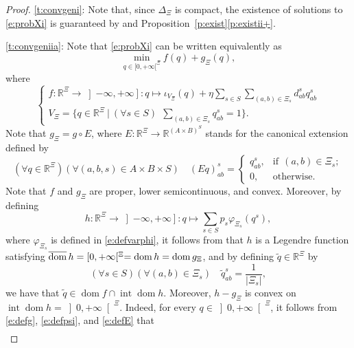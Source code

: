 \documentclass[smallextended,referee,envcountsect,]{svjour3}
\newcommand{\R}{{\mathbb R}}
\newcommand{\dom}{\ensuremath{\operatorname{dom}}}
\newcommand{\inte}{\ensuremath{\operatorname{int}}}
\newcommand{\menge}[2]{\big\{{#1}~\big |~{#2}\big\}}
\begin{document}
\begin{proof}
\ref{t:convgeni}:
Note that, since $\Delta_\Xi$ is compact, the existence 
of solutions to \eqref{e:probXi} is guaranteed by 
{\cite[Theorem~2.12]{Beck2017}} and 
Proposition~\ref{p:exist}\eqref{p:existii+}.

\ref{t:convgeniia}: Note that \eqref{e:probXi} can be written 
equivalently as 
\begin{equation}
\min_{q\in [0,+\infty[^{\Xi}}f(q)+g_{\Xi}(q),
\end{equation}
where 
{\begin{equation}
\begin{cases}
f\colon \R^{\Xi}\to\left]-\infty,+\infty\right]\colon q\mapsto 
\iota_{V_\Xi}(q)+\eta
\sum_{s\in S}\sum_{(a,b)\in \Xi_s}d_{ab}^sq_{ab}^s\\
V_{\Xi}=\menge{q\in \R^{\Xi}}{(\forall s\in 
S)\:\:\sum_{(a,b)\in\Xi_s}q_{ab}^s=1}.
\end{cases}
\end{equation}
Note that $g_{\Xi}=g\circ E$, where}
$E\colon \R^{\Xi}\to\R^{(A\times B)^S}$ stands for the 
canonical extension defined by
\begin{equation}
\label{e:defE}
(\forall q\in \R^{\Xi})(\forall (a,b,s)\in A\times B\times S)\quad 
(Eq)_{ab}^s=
\begin{cases}
q_{ab}^s,&\text{if}\:\: (a,b)\in \Xi_s;\\
0,&\text{otherwise}.
\end{cases}
\end{equation}
Note that $f$ and $g_{\Xi}$ are proper, lower semicontinuous, and 
convex.
Moreover, by defining 
\begin{equation}
\label{e:defh}
h\colon \R^{\Xi}\to\left]-\infty,+\infty\right]\colon q\mapsto 
\sum_{s\in 
S}p_s\varphi_{\Xi_s}(q^s),
\end{equation}
where {$\varphi_{\Xi_s}$
is defined in \eqref{e:defvarphi}}, it follows from 
\cite[Example~1]{BauMOR} that $h$ is a Legendre function 
satisfying $\overline{\rm dom }\,h=[0,+\infty[^{\Xi}={\rm dom}\, h= 
{\rm dom}\, g_{\Xi}$, 
and by defining $\widetilde{q}\in\R^{\Xi}$ by
$$(\forall s\in S)(\forall (a,b)\in\Xi_s)\quad 
\widetilde{q}_{ab}^s=\frac{1}{|\Xi_s|},$$ we have that
$\widetilde{q}\in\dom f\cap \inte\dom h$.
Moreover, $h-g_{\Xi}$ is convex on 
$\inte\dom h=\left]0,+\infty\right[^{\Xi}$. 
Indeed, 
for every $q\in \left]0,+\infty\right[^{\Xi}$, 
it follows from \eqref{e:defg}, \eqref{e:defpsi}, and \eqref{e:defE} 
that
\begin{align}
\label{e:hminusgconv}

\end{align}
\end{proof}
\end{document}
